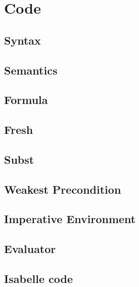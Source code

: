 \section{Code}\label{code}
\subsection{Syntax}


\subsection{Semantics}


\subsection{Formula}\label{codeformulas}


\subsection{Fresh}


\subsection{Subst}


\subsection{Weakest Precondition}


\subsection{Imperative Environment}\label{codemodel}


\subsection{Evaluator}


\subsection{Isabelle code}\label{codeisabelle}





